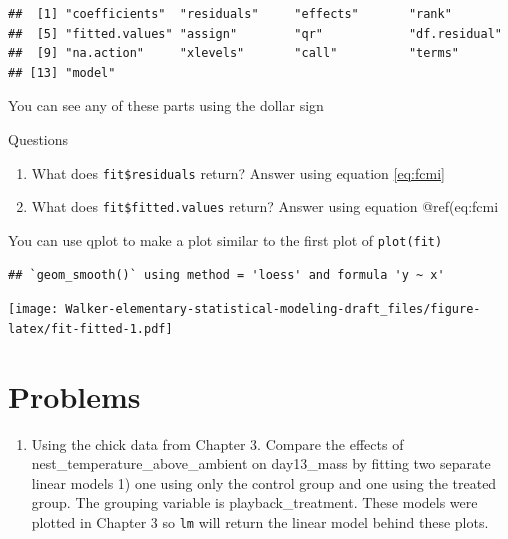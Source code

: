 \documentclass[]{book}
\newenvironment{Shaded}{\begin{snugshade}}{\end{snugshade}}
\newcommand{\KeywordTok}[1]{\textcolor[rgb]{0.13,0.29,0.53}{\textbf{#1}}}
\newcommand{\DataTypeTok}[1]{\textcolor[rgb]{0.13,0.29,0.53}{#1}}
\newcommand{\StringTok}[1]{\textcolor[rgb]{0.31,0.60,0.02}{#1}}
\newcommand{\OperatorTok}[1]{\textcolor[rgb]{0.81,0.36,0.00}{\textbf{#1}}}
\newcommand{\NormalTok}[1]{#1}
\providecommand{\tightlist}{%
  \setlength{\itemsep}{0pt}\setlength{\parskip}{0pt}}
\begin{document}
\begin{verbatim}
##  [1] "coefficients"  "residuals"     "effects"       "rank"         
##  [5] "fitted.values" "assign"        "qr"            "df.residual"  
##  [9] "na.action"     "xlevels"       "call"          "terms"        
## [13] "model"
\end{verbatim}

You can see any of these parts using the dollar sign

Questions

\begin{enumerate}
\def\labelenumi{\arabic{enumi}.}
\setcounter{enumi}{6}
\item
  What does \texttt{fit\$residuals} return? Answer using equation
  \eqref{eq:fcmi}
\item
  What does \texttt{fit\$fitted.values} return? Answer using equation
  @ref(eq:fcmi
\end{enumerate}

You can use qplot to make a plot similar to the first plot of
\texttt{plot(fit)}

\begin{Shaded}
\end{Shaded}

\begin{verbatim}
## `geom_smooth()` using method = 'loess' and formula 'y ~ x'
\end{verbatim}

\texttt{[image: Walker-elementary-statistical-modeling-draft\_files/figure-latex/fit-fitted-1.pdf]}

\section{Problems}\label{problems-2}

\begin{enumerate}
\def\labelenumi{\arabic{enumi}.}
\tightlist
\item
  Using the chick data from Chapter 3. Compare the effects of
  nest\_temperature\_above\_ambient on day13\_mass by fitting two
  separate linear models 1) one using only the control group and one
  using the treated group. The grouping variable is playback\_treatment.
  These models were plotted in Chapter 3 so \texttt{lm} will return the
  linear model behind these plots.
\end{enumerate}
\end{document}
